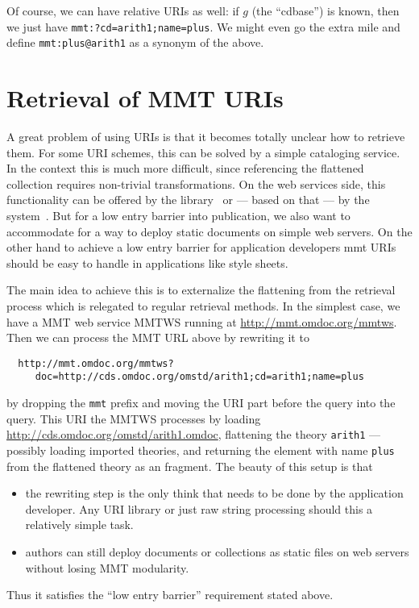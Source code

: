 \documentclass[12pt]{article}
\begin{document}
Of course, we can have relative URIs as well: if $g$ (the ``cdbase'') is known, then we
just have {\texttt{mmt:?cd=arith1;name=plus}}. We might even go the extra mile and define
{\texttt{mmt:plus@arith1}} as a synonym of the above.

\section{Retrieval of MMT URIs}

A great problem of using URIs is that it becomes totally unclear how to retrieve them. For
some URI schemes, this can be solved by a simple cataloging service. In the {\omdoc}
context this is much more difficult, since referencing the flattened collection requires
non-trivial transformations. On the web services side, this functionality can be offered
by the {\jomdoc} library~\cite{JOMDoc:webpage} or --- based on that --- by the {\ombase}
system~\cite{OMBase:webpage}. But for a low entry barrier into {\omdoc} publication, we
also want to accommodate for a way to deploy static {\omdoc} documents on simple web
servers. On the other hand to achieve a low entry barrier for application developers mmt
URIs should be easy to handle in applications like {\xslt} style sheets.

The main idea to achieve this is to externalize the flattening from the retrieval process
which is relegated to regular retrieval methods. In the simplest case, we have a MMT web
service MMTWS running at \url{http://mmt.omdoc.org/mmtws}. Then we can process the MMT URL
above by rewriting it to

\begin{verbatim}
  http://mmt.omdoc.org/mmtws?
     doc=http://cds.omdoc.org/omstd/arith1;cd=arith1;name=plus
\end{verbatim}

by dropping the {\texttt{mmt}} prefix and moving the URI part before the query into the
query. This
URI the MMTWS processes by loading \url{http://cds.omdoc.org/omstd/arith1.omdoc},
flattening the theory {\texttt{arith1}} --- possibly loading imported theories, and
returning the element with name {\texttt{plus}} from the flattened theory as an {\omdoc}
fragment. The beauty of this setup is that
\begin{itemize}
\item the rewriting step is the only think that needs to be done by the application
  developer. Any URI library or just raw string processing should this a relatively simple
  task.
\item {\omdoc} authors can still deploy {\omdoc} documents or collections as static files
  on web servers without losing MMT modularity.
\end{itemize}
Thus it satisfies the ``low entry barrier'' requirement stated above.
\end{document}
